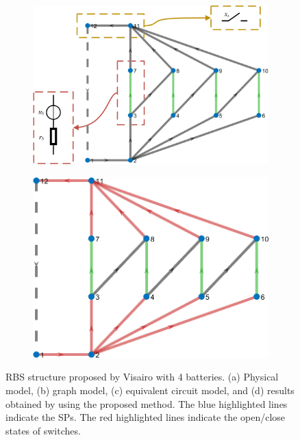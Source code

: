 \documentclass{article}
\begin{document}
\begin{figure}[htbp]
\begin{subfigure}[b]{0.45\textwidth}
        \includegraphics[width=\textwidth]{../attachments/f-dege-4-modify.png}
        \caption{}
        \label{fig:f4-circ}
    \end{subfigure}
    \hspace{0.05\textwidth}
    \begin{subfigure}[b]{0.45\textwidth}
        \includegraphics[width=\textwidth]{../attachments/f-dege-mac-4.png}
        \caption{}
        \label{fig:f4-mac}
    \end{subfigure}
    \caption{ 
        RBS structure proposed by Visairo\cite{visairoReconfigurableBatteryPack2008} with 4 batteries. 
        (a) Physical model, (b) graph model, (c) equivalent circuit model, and (d) results obtained by using the proposed method.
        The blue highlighted lines indicate the SPs. 
        The red highlighted lines indicate the open/close states of switches.
        }
    \label{fig:f4-all}
\end{figure}
\end{document}

